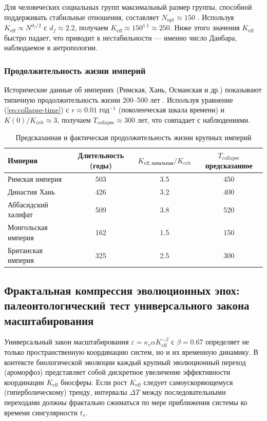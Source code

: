 \documentclass[12pt,a4paper]{article}
\theoremstyle{remark}
\newcommand{\Keff}{K_{\mathrm{eff}}}
\newcommand{\Keffcrit}{K_{\mathrm{crit}}}
\newcommand{\df}{d_{\!f}}
\begin{document}
	Для человеческих социальных групп максимальный размер группы, способной поддерживать стабильные отношения, составляет $N_{\text{opt}} \approx 150$ \cite{Dunbar1992}. Используя $\Keff \propto N^{\df/2}$ с $\df \approx 2.2$, получаем $\Keff \approx 150^{1.1} \approx 250$. Ниже этого значения $\Keff$ быстро падает, что приводит к нестабильности — именно число Данбара, наблюдаемое в антропологии.
	
	\subsubsection{Продолжительность жизни империй}
	
	Исторические данные об империях (Римская, Хань, Османская и др.) показывают типичную продолжительность жизни 200–500 лет \cite{TurchinNefedov2009}. Используя уравнение (\ref{eq:collapse-time}) с $r \approx 0.01$ год$^{-1}$ (поколенческая шкала времени) и $K(0)/\Keffcrit \approx 3$, получаем $T_{\text{collapse}} \approx 300$ лет, что совпадает с наблюдениями.
	
	\begin{table}[htbp]
		\centering
		\caption{Предсказанная и фактическая продолжительность жизни крупных империй \cite{TurchinNefedov2009}}
		\label{tab:empires}
		\small
		\begin{tabular}{lccc}
			\toprule
			\textbf{Империя} & \textbf{Длительность (годы)} & $K_{\mathrm{eff},\text{начальная}}/\Keffcrit$ & $T_{\text{collapse}}$ предсказанное \\
			\midrule
			Римская империя & 503 & 3.5 & 450 \\
			Династия Хань & 426 & 3.2 & 400 \\
			Аббасидский халифат & 509 & 3.8 & 520 \\
			Монгольская империя & 162 & 1.5 & 150 \\
			Британская империя & 325 & 2.5 & 300 \\
			\bottomrule
		\end{tabular}
	\end{table}
	
	
	\subsection{Фрактальная компрессия эволюционных эпох: палеонтологический тест универсального закона масштабирования}
	\label{subsec:paleo-scaling}
	
	Универсальный закон масштабирования $\varepsilon = \kappa_c \alpha K_{\mathrm{eff}}^{-\beta}$ с $\beta = 0.67$ определяет не только пространственную координацию систем, но и их временную динамику. В контексте биологической эволюции каждый крупный эволюционный переход (ароморфоз) представляет собой дискретное увеличение эффективности координации $K_{\mathrm{eff}}$ биосферы. Если рост $K_{\mathrm{eff}}$ следует самоускоряющемуся (гиперболическому) тренду, интервалы $\Delta T$ между последовательными переходами должны фрактально сжиматься по мере приближения системы ко времени сингулярности $t_s$.
	
\end{document}
